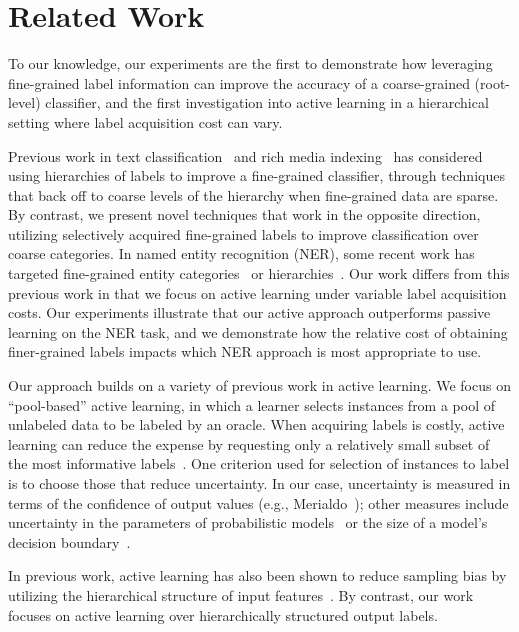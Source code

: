 \documentclass[10pt, conference, compsocconf]{IEEEtran}
\begin{document}
%


\section{Related Work}
\label{sec:relwork}

To our knowledge, our experiments are the first to demonstrate
how leveraging fine-grained label information can improve the
accuracy of a coarse-grained (root-level) classifier, and the first
investigation into active learning in a hierarchical setting where
label acquisition cost can vary.

Previous work in text classification~\cite{mccallum1998improving} and rich media indexing~\cite{jiang2013} has considered using
hierarchies of labels to improve a fine-grained classifier, through
techniques that back off to coarse
levels of the hierarchy when fine-grained data are sparse. 
By contrast, we present novel techniques
that work in the opposite direction, utilizing selectively
acquired fine-grained labels to improve
classification over coarse categories.
In named entity recognition (NER), some recent work has targeted
fine-grained entity categories~\cite{fleischman2002fine,ling2012fine}
or hierarchies~\cite{yosef2012hyena}.  Our work differs from this
previous work in that we focus on active learning under variable
label acquisition costs.
Our experiments illustrate that our active approach outperforms
passive learning on the NER task, and we demonstrate how the
relative cost of obtaining finer-grained labels impacts
which NER approach is most appropriate to use.

Our approach builds on a variety of previous work in active learning.
We focus on ``pool-based'' active learning, in which
a learner selects instances from a pool of unlabeled data to be 
labeled by an oracle. When acquiring
labels is costly, active learning can reduce
the expense by requesting only a relatively small subset
of the most informative labels~\cite{Rubens2011}.
One criterion used for selection of instances to label is to
choose those that reduce uncertainty. In our case,
uncertainty is measured in terms of the confidence of output values
(e.g., Merialdo~\cite{Merialdo2001}); other measures include
uncertainty in the parameters of probabilistic models~\cite{Hofmann2003}
or the size of a model's decision boundary~\cite{Schohn2000}.  

In previous work, active learning has also been shown 
to reduce sampling bias by utilizing the hierarchical structure of input
features~\cite{Dasgupta2008, Symons2006}. By contrast, 
our work focuses on active learning over hierarchically
structured output labels.
\end{document}
